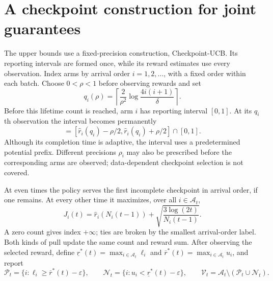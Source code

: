 \section{A checkpoint construction for joint guarantees}
\label{sec:method}

The upper bounds use a fixed-precision construction, Checkpoint-UCB. Its
reporting intervals are formed once, while its reward estimates use every
observation. Index arms by arrival order $i=1,2,\ldots$, with a fixed order
within each batch. Choose $0<\rho<1$ before observing rewards and set
\begin{equation}
 q_i(\rho)=\left\lceil\frac2{\rho^2}
                  \log\frac{4i(i+1)}\delta\right\rceil.
 \label{eq:checkpoint}
\end{equation}
Before this lifetime count is reached, arm $i$ has reporting interval $[0,1]$.
At its $q_i$th observation the interval becomes permanently
\begin{equation}
 [\ell_i,u_i]=[\hat r_i(q_i)-\rho/2,
                 \hat r_i(q_i)+\rho/2]\cap[0,1].
 \label{eq:fixed_interval}
\end{equation}
Although its completion time is adaptive, the
interval uses a predetermined potential prefix. Different precisions
$\rho_i$ may also be prescribed before the corresponding arms are observed;
data-dependent checkpoint selection is not covered.

At even times the policy serves the first incomplete checkpoint in arrival
order, if one remains. At every other time it maximizes, over all
$i\in\mathcal A_t$,
\begin{equation}
 J_i(t)=\hat r_i(N_i(t-1))+
             \sqrt{\frac{3\log(2t)}{N_i(t-1)}}.
 \label{eq:ucb}
\end{equation}
A zero count gives index $+\infty$; ties are broken by the smallest
arrival-order label. Both kinds of pull update the same count and reward
sum. After observing the selected reward, define
$\underline r^*(t)=\max_{i\in\mathcal A_t}\ell_i$ and
$\overline r^*(t)=\max_{i\in\mathcal A_t}u_i$, and report
\begin{equation}
 \mathcal P_t=\{i:\ell_i\ge\overline r^*(t)-\varepsilon\},\qquad
 \mathcal N_t=\{i:u_i<\underline r^*(t)-\varepsilon\},\qquad
 \mathcal V_t=\mathcal A_t\setminus(\mathcal P_t\cup\mathcal N_t).
 \label{eq:reports}
\end{equation}

